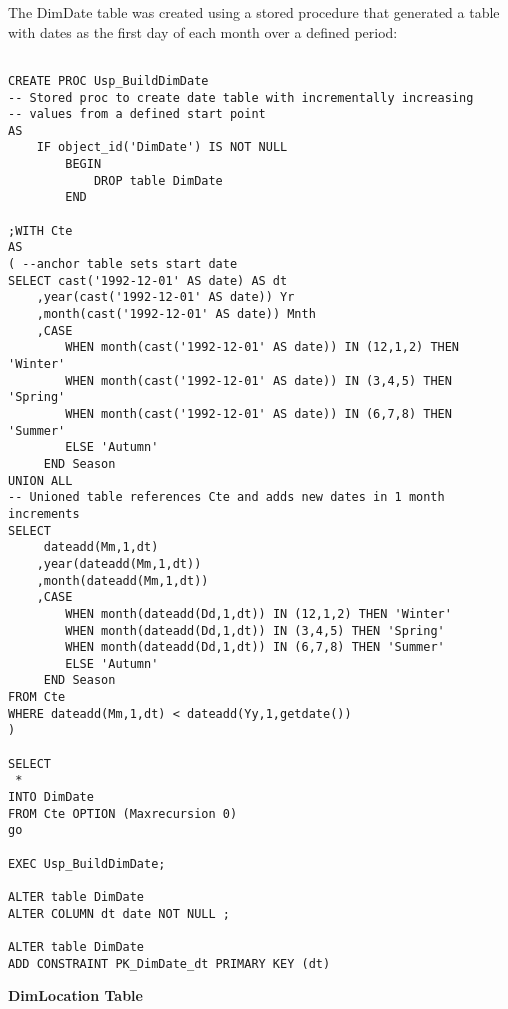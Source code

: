 \documentclass{article}
\begin{document}
The DimDate table was created using a stored procedure that generated a table with dates as the first day of each month over a defined period:
\begin{lstlisting}

CREATE PROC Usp_BuildDimDate
-- Stored proc to create date table with incrementally increasing 
-- values from a defined start point
AS 
	IF object_id('DimDate') IS NOT NULL 
		BEGIN 
			DROP table DimDate
		END  

;WITH Cte 
AS 
( --anchor table sets start date
SELECT cast('1992-12-01' AS date) AS dt
	,year(cast('1992-12-01' AS date)) Yr
	,month(cast('1992-12-01' AS date)) Mnth
	,CASE 
		WHEN month(cast('1992-12-01' AS date)) IN (12,1,2) THEN 'Winter' 
		WHEN month(cast('1992-12-01' AS date)) IN (3,4,5) THEN 'Spring' 
		WHEN month(cast('1992-12-01' AS date)) IN (6,7,8) THEN 'Summer' 
		ELSE 'Autumn' 
	 END Season 
UNION ALL
-- Unioned table references Cte and adds new dates in 1 month increments
SELECT 
	 dateadd(Mm,1,dt)
	,year(dateadd(Mm,1,dt))
	,month(dateadd(Mm,1,dt))
	,CASE 
		WHEN month(dateadd(Dd,1,dt)) IN (12,1,2) THEN 'Winter' 
		WHEN month(dateadd(Dd,1,dt)) IN (3,4,5) THEN 'Spring' 
		WHEN month(dateadd(Dd,1,dt)) IN (6,7,8) THEN 'Summer' 
		ELSE 'Autumn' 
	 END Season
FROM Cte 
WHERE dateadd(Mm,1,dt) < dateadd(Yy,1,getdate()) 
)  

SELECT
 * 
INTO DimDate 
FROM Cte OPTION (Maxrecursion 0)
go

EXEC Usp_BuildDimDate;

ALTER table DimDate
ALTER COLUMN dt date NOT NULL ;

ALTER table DimDate
ADD CONSTRAINT PK_DimDate_dt PRIMARY KEY (dt)

\end{lstlisting}
\bigskip

\noindent
\textbf{DimLocation Table}
\end{document}
